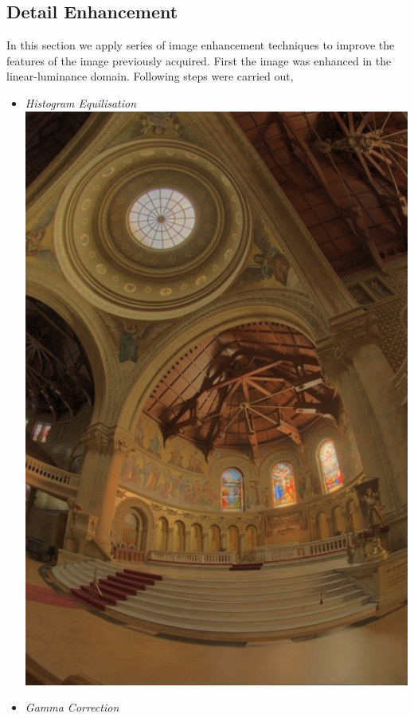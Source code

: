 \documentclass{article}
\begin{document}
    \subsection*{Detail Enhancement}
    In this section we apply series of image enhancement techniques to improve the features of the image previously acquired.
    First the image was enhanced in the linear-luminance domain. Following steps were carried out,
    \begin{itemize}
        \item \textit{Histogram Equilisation} \\
        \includegraphics[scale=.25]{./data/2/ln/s1.jpg}
        \item \textit{Gamma Correction}\\

\end{itemize}
\end{document}
